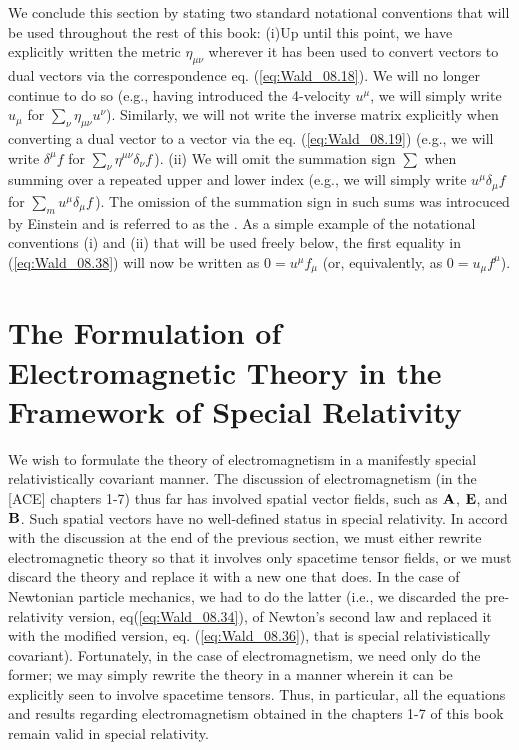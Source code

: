 We conclude this section by stating two standard notational conventions that will be used throughout the rest of this book: (i)Up until this point, we have explicitly written the metric $\eta_{\mu \nu}$ wherever it has been used to convert vectors to dual vectors via the correspondence eq. (\ref{eq:Wald_08.18}). We will no longer continue to do so (e.g., having introduced the 4-velocity $u^\mu$, we will simply write $u_\mu$ for $\sum_\nu \eta_{\mu \nu} u^\nu$). Similarly, we will not write the inverse matrix explicitly when converting a dual vector to a vector via the eq. (\ref{eq:Wald_08.19}) (e.g., we will write $\delta^\mu f$ for $\sum_\nu \eta^{\mu \nu} \delta_\nu f\,$). (ii) We will omit the summation sign $\sum$ when summing over a repeated upper and lower index (e.g., we will simply write $u^\mu \delta_\mu f$ for $\sum_m u^\mu \delta_\mu f\,$). The omission of the summation sign in such sums was introcuced by Einstein and is referred to as the . As a simple example of the notational conventions (i) and (ii) that will be used freely below, the first equality in (\ref{eq:Wald_08.38}) will now be written as $0 = u^\mu f_\mu$ (or, equivalently, as $0 = u_\mu f^\mu$). 

\section[Covariant Electromagnetic Theory]{The Formulation of Electromagnetic Theory in the Framework of Special Relativity}
\label{sec:Wald_08.2}

We wish to formulate the theory of electromagnetism in a manifestly special relativistically covariant manner. The discussion of electromagnetism (in the [ACE] chapters 1-7) thus far has involved spatial vector fields, such as $\vb{A}$, $\vb{E}$, and $\vb{B}$. Such spatial vectors have no well-defined status in special relativity. In accord with the discussion at the end of the previous section, we must either rewrite electromagnetic theory so that it involves only spacetime tensor fields, or we must discard the theory and replace it with a new one that does. In the case of Newtonian particle mechanics, 
we had to do the latter (i.e., we discarded the pre-relativity version, eq(\ref{eq:Wald_08.34}), of Newton's second law and replaced it with the modified version, eq. (\ref{eq:Wald_08.36}), that is special relativistically covariant). Fortunately, in the case of electromagnetism, we need only do the former; we may simply rewrite the theory in a manner wherein it can be explicitly seen to involve spacetime tensors. Thus, in particular, all the equations and results regarding electromagnetism obtained in the chapters 1-7 of this book remain valid in special relativity.

